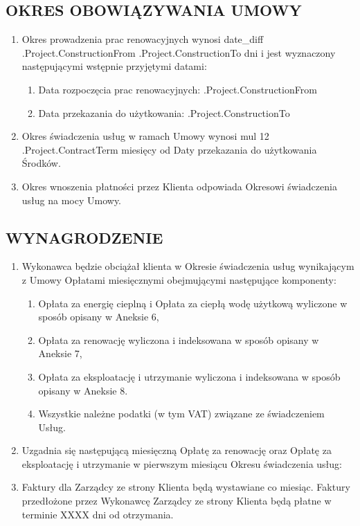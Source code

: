 \subsection{OKRES OBOWIĄZYWANIA UMOWY}
\begin{enumerate}
	\item Okres prowadzenia prac renowacyjnych wynosi {{date_diff .Project.ConstructionFrom .Project.ConstructionTo}} dni i jest wyznaczony następującymi wstępnie przyjętymi datami:
	\begin{enumerate}
		\item Data rozpoczęcia prac renowacyjnych: \iffalse input project.construction_from value="{{.Project.ConstructionFrom}}" type="date" \fi {{.Project.ConstructionFrom}}
		\item Data przekazania do użytkowania:     \iffalse input project.construction_to value="{{.Project.ConstructionTo}}" type="date" \fi {{.Project.ConstructionTo}}
	\end{enumerate}
	\item Okres świadczenia usług w ramach Umowy wynosi {{mul 12 .Project.ContractTerm}} miesięcy od Daty przekazania do użytkowania Środków.
	\item Okres wnoszenia płatności przez Klienta odpowiada Okresowi świadczenia usług na mocy Umowy.
	\end{enumerate}

\subsection{WYNAGRODZENIE}
\begin{enumerate}
	\item Wykonawca będzie obciążał klienta w Okresie świadczenia usług wynikającym z Umowy Opłatami miesięcznymi obejmującymi następujące komponenty:
	\begin{enumerate}
		\item Opłata za energię cieplną i Opłata za ciepłą wodę użytkową wyliczone w sposób opisany w Aneksie 6,
		\item Opłata za renowację wyliczona i indeksowana w sposób opisany w Aneksie 7,
		\item Opłata za eksploatację i utrzymanie wyliczona i indeksowana w sposób opisany w Aneksie 8.
		\item Wszystkie należne podatki (w tym VAT) związane ze świadczeniem Usług.
	\end{enumerate}
	\item Uzgadnia się następującą miesięczną Opłatę za renowację oraz Opłatę za eksploatację i utrzymanie w pierwszym miesiącu Okresu świadczenia usług:
	\item Faktury dla Zarządcy ze strony Klienta będą wystawiane co miesiąc. Faktury przedłożone przez Wykonawcę Zarządcy ze strony Klienta będą płatne w terminie XXXX dni od otrzymania.
\end{enumerate}

